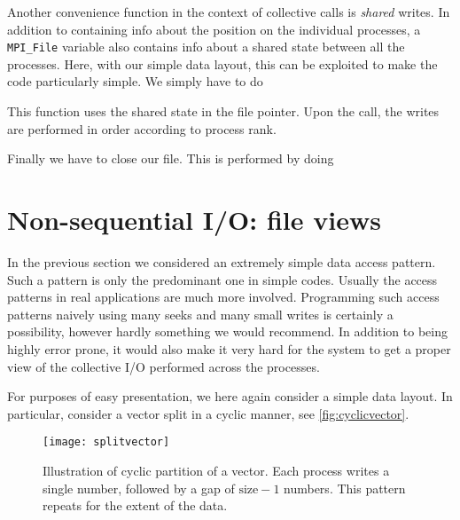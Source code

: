 Another convenience function in the context of collective calls is \emph{shared}
writes. In addition to containing info about the position on the individual
processes, a \texttt{MPI\_File} variable also contains info about a shared state
between all the processes. Here, with our simple data layout, this can be
exploited to make the code particularly simple. We simply have to do

This function uses the shared state in the file pointer. Upon the call, the writes
are performed in order according to process rank.

Finally we have to close our file. This is performed by doing


\section{Non-sequential I/O: file views}

In the previous section we considered an extremely simple data access pattern.
Such a pattern is only the predominant one in simple codes. Usually the access
patterns in real applications are much more involved. Programming such access
patterns naively using many seeks and many small writes is certainly a
possibility, however hardly something we would recommend. In addition to being
highly error prone, it would also make it very hard for the system to get a
proper view of the collective I/O performed across the processes.

For purposes of easy presentation, we here again consider a simple data layout.
In particular, consider a vector split in a cyclic manner, see
\autoref{fig:cyclicvector}.

\begin{figure}
  \begin{center}
    \texttt{[image: splitvector]}
  \end{center}
  \caption{
    Illustration of cyclic partition of a vector. Each process writes a single
    number, followed by a gap of $\text{size}-1$ numbers. This pattern repeats for the
    extent of the data.
  }
  \label{fig:cyclicvector}
\end{figure}

